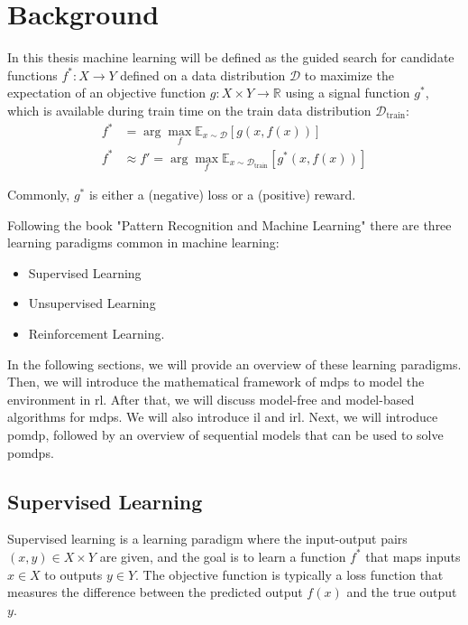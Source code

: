 
\chapter{Background}
\label{chapter:Background}
In this thesis machine learning will be defined as the guided search for candidate functions $f^*: X \to Y$ defined on a data distribution $\mathcal{D}$ to maximize the expectation of an objective function 
${g: X \times Y \to \mathbb{R}}$ using a signal function $g^*$, which is available during train time on the train data distribution $\mathcal{D}_{\text{train}}$:
\begin{equation}
    \label{general_learning_paradigm}
    \begin{aligned}
        f^* &= \arg\max_{f} \mathbb{E}_{x \sim \mathcal{D}}[g(x,f(x))] \\
        f^* &\approx f' = \arg\max_{f} \mathbb{E}_{x \sim \mathcal{D}_{\text{train}}}[g^*(x,f(x))]
    \end{aligned}
\end{equation}

Commonly, $g^*$ is either a (negative) loss or a (positive) reward.

Following the book "Pattern Recognition and Machine Learning" \cite{bishop} there are three learning paradigms common in machine learning: 
\begin{itemize}
	\item Supervised Learning
	\item Unsupervised Learning
	\item Reinforcement Learning.
\end{itemize}

In the following sections, we will provide an overview of these learning paradigms. 
Then, we will introduce the mathematical framework of \ac{mdp}s to model the environment in \ac{rl}. 
After that, we will discuss model-free and model-based algorithms for \ac{mdp}s. We will also introduce \ac{il} and \ac{irl}. 
Next, we will introduce \ac{pomdp}, followed by an overview of sequential models that can be used 
to solve \ac{pomdp}s.

\section{Supervised Learning}
\label{section:super_learn}
Supervised learning is a learning paradigm where the input-output pairs $(x,y) \in X \times Y$ are given, and the goal is to learn a function 
$f^*$ that maps inputs $x \in X$ to outputs $y \in Y$. The objective function is typically a loss function that measures the difference between 
the predicted output $f(x)$ and the true output $y$.

